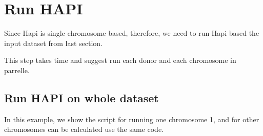 \documentclass[
  letterpaper,
  DIV=11,
  numbers=noendperiod]{scrreprt}
\begin{document}

\hypertarget{run-hapi}{%
\chapter{Run HAPI}\label{run-hapi}}

Since Hapi is single chromosome based, therefore, we need to run Hapi
based the input dataset from last section.

This step takes time and suggest run each donor and each chromosome in
parrelle.

\hypertarget{run-hapi-on-whole-dataset}{%
\section{Run HAPI on whole dataset}\label{run-hapi-on-whole-dataset}}

In this example, we show the script for running one chromosome 1, and
for other chromosomes can be calculated use the same code.
\end{document}
